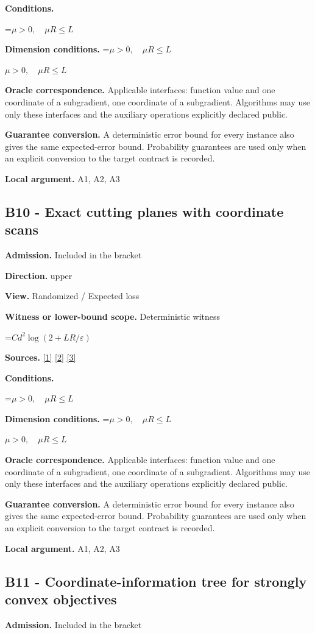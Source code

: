 \documentclass[10pt,a4paper]{article}
\newcommand{\AtlasMath}[1]{\par\begingroup\centering\setbox0=\hbox{$\displaystyle #1$}\ifdim\wd0>1.4\linewidth\typeout{ATLAS WIDE FORMULA: \the\wd0}\fi\ifdim\wd0>\linewidth\resizebox{\linewidth}{!}{\box0}\else\box0\fi\par\endgroup}
\newcommand{\AtlasInlineMath}[1]{\begingroup\setbox0=\hbox{$#1$}\ifdim\wd0>.4\linewidth\endgroup\AtlasMath{#1}\else\endgroup$#1$\fi}
\begin{document}
\textbf{Conditions.} 
\AtlasMath{\mu>0,\quad\mu R\le L}


\textbf{Dimension conditions.} \AtlasInlineMath{\mu>0,\quad\mu R\le L}

\textbf{Oracle correspondence.} Applicable interfaces: function value and one coordinate of a subgradient, one coordinate of a subgradient. Algorithms may use only these interfaces and the auxiliary operations explicitly declared public.

\textbf{Guarantee conversion.} A deterministic error bound for every instance also gives the same expected-error bound. Probability guarantees are used only when an explicit conversion to the target contract is recorded.

\textbf{Local argument.} A1, A2, A3

\subsection{B10 - Exact cutting planes with coordinate scans}
\textbf{Admission.} Included in the bracket

\textbf{Direction.} upper

\textbf{View.} Randomized / Expected loss

\textbf{Witness or lower-bound scope.} Deterministic witness

\AtlasMath{Cd^2\log(2+LR/\varepsilon)}
\textbf{Sources.} \href{https://arxiv.org/pdf/1405.4980}{[1]} \href{https://www2.isye.gatech.edu/~nemirovs/MOR_AccuracyCertificates.pdf}{[2]} \href{https://arxiv.org/pdf/2609.20701}{[3]}

\textbf{Conditions.} 
\AtlasMath{\mu>0,\quad\mu R\le L}


\textbf{Dimension conditions.} \AtlasInlineMath{\mu>0,\quad\mu R\le L}

\textbf{Oracle correspondence.} Applicable interfaces: function value and one coordinate of a subgradient, one coordinate of a subgradient. Algorithms may use only these interfaces and the auxiliary operations explicitly declared public.

\textbf{Guarantee conversion.} A deterministic error bound for every instance also gives the same expected-error bound. Probability guarantees are used only when an explicit conversion to the target contract is recorded.

\textbf{Local argument.} A1, A2, A3

\subsection{B11 - Coordinate-information tree for strongly convex objectives}
\textbf{Admission.} Included in the bracket
\end{document}

